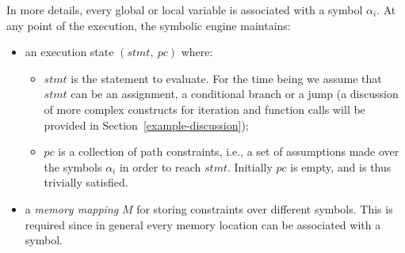 In more details, every global or local variable is associated with a symbol $\alpha_i$.  At any point of the execution, the symbolic engine maintains:

\begin{itemize}
  \item  an execution state $(stmt,~pc)$ where:
\begin{itemize}
  \item $stmt$ is the statement to evaluate. For the time being we assume that $stmt$ can be an assignment, a conditional branch or a jump (a discussion of more complex constructs for iteration and function calls will be provided in Section~\ref{example-discussion});
  \item $pc$ is a collection of path constraints, i.e., a set of assumptions made over the symbols $\alpha_i$ in order to reach $stmt$. Initially $pc$ is empty, and is thus trivially satisfied.
\end{itemize}
\item a {\em memory mapping} $M$ for storing constraints over different symbols. This is required since in general every memory location can be associated with a symbol.
\end{itemize}

